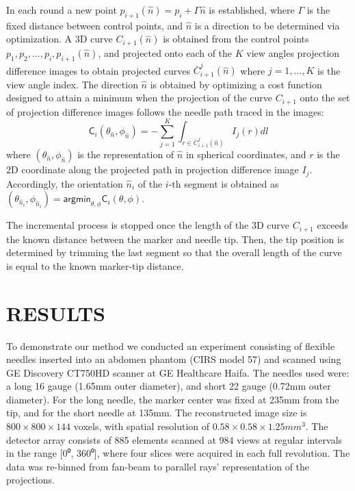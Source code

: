 \documentclass[letterpaper, 10 pt, conference]{ieeeconf}  %
\begin{document}
In each round a new point $p_{i+1}(\hat{n}) = p_i + \Gamma \hat{n}$ is established, where $\Gamma$ is the fixed distance between control points, and $\hat{n}$ is a direction to be determined via optimization. 
A 3D curve $C_{i+1}(\hat{n})$ is obtained from the control points $p_1, p_2, ..., p_i, p_{i+1}(\hat{n})$, and projected onto each of the $K$ view angles projection difference images to obtain projected curves $\bar{C}_{i+1}^j(\hat{n})$ where $j=1,...,K$ is the view angle index.
The direction $\hat{n}$ is obtained by optimizing a cost function designed to attain a minimum when the projection of the curve $C_{i+1}$ onto the set of projection difference images follows the needle path traced in the images:
\[ \textsf{C}_i(\theta_{\hat{n}}, \phi_{\hat{n}}) = -\sum_{j=1}^K{\int_{r \in \bar{C}_{i+1}^j(\hat{n})} {I_j(r)dl}} \]
where $ (\theta_{\hat{n}}, \phi_{\hat{n}}) $ is the representation of $ \hat{n} $ in spherical coordinates, and $r$ is the 2D coordinate along the projected path in projection difference image $I_j$. 
Accordingly, the orientation $\hat{n}_i$ of the $i$-th segment is obtained as $(\theta_{\hat{n}_i}, \phi_{\hat{n}_i}) = \textsf{argmin}_{\theta, \phi} \textsf{C}_i ( \theta, \phi)$.

The incremental process is stopped once the length of the 3D curve $C_{i+1}$ exceeds the known distance between the marker and needle tip. Then, the tip position is determined by trimming the last segment so that the overall length of the curve is equal to the known marker-tip distance.

\section{RESULTS}

To demonstrate our method we conducted an experiment consisting of flexible needles inserted into an abdomen phantom (CIRS model 57) and scanned using GE Discovery CT750HD scanner at GE Healthcare Haifa. The needles used were: a long 16 gauge (1.65mm outer diameter), and short 22 gauge (0.72mm outer diameter). For the long needle, the marker center was fixed at 235mm from the tip, and for the short needle at 135mm.
The reconstructed image size is $ 800 \times 800 \times 144 $ voxels, with spatial resolution of $0.58 \times 0.58 \times 1.25mm^3$. The detector array consists of 885 elements scanned at 984 views at regular intervals in the range [0⁰, 360⁰], where four slices were acquired in each full revolution. The data was re-binned from fan-beam to parallel rays’ representation of the projections.
\end{document}
